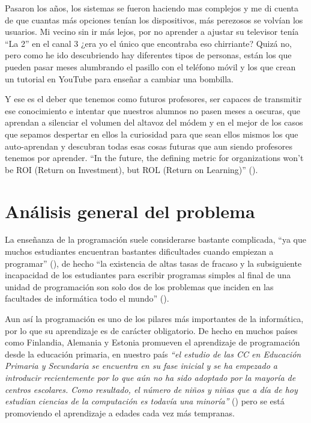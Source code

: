 \bigskip
Pasaron los años, los sistemas se fueron haciendo mas complejos y me di cuenta de que cuantas más opciones tenían los dispositivos, más perezosos se volvían los usuarios. Mi vecino sin ir más lejos, por no aprender a ajustar su televisor tenía ``La 2'' en el canal 3 ¿era yo el único que encontraba eso chirriante? Quizá no, pero como he ido descubriendo hay diferentes tipos de personas, están los que pueden pasar meses alumbrando el pasillo con el teléfono móvil y los que crean un tutorial en YouTube para enseñar a cambiar una bombilla.

\bigskip
Y ese es el deber que tenemos como futuros profesores, ser capaces de transmitir ese conocimiento e intentar que nuestros alumnos no pasen meses a oscuras, que aprendan a silenciar el volumen del altavoz del módem y en el mejor de los casos que sepamos despertar en ellos la curiosidad para que sean ellos mismos los que auto-aprendan y descubran todas esas cosas futuras que aun siendo profesores tenemos por aprender. ``In the future, the defining metric for organizations won’t be ROI (Return on Investment), but ROL (Return on Learning)'' (\cite{ismail_exponential_2014}).

\section{Análisis general del problema}

La enseñanza de la programación suele considerarse bastante complicada, ``ya que muchos estudiantes encuentran bastantes dificultades cuando empiezan a programar'' (\cite{rubio_uso_2018}), de hecho ``la existencia de altas tasas de fracaso y la subsiguiente incapacidad de los estudiantes para escribir programas simples al final de una unidad de programación son solo dos de los problemas que inciden en las facultades de informática todo el mundo'' (\cite{bruce_contemporary_2002}).

\bigskip
Aun así la programación es uno de los pilares más importantes de la informática, por lo que su aprendizaje es de carácter obligatorio. De hecho en muchos países como Finlandia, Alemania y Estonia promueven el aprendizaje de programación desde la educación primaria, en nuestro país \textit{``el estudio de las CC en Educación Primaria y Secundaria se encuentra en su fase inicial y se ha empezado a introducir recientemente por lo que aún no ha sido adoptado por la mayoría de centros escolares. Como resultado, el número de niños y niñas que a día de hoy estudian ciencias de la computación es todavía una minoría''} (\cite{fecyt_educacion_2016}) pero se está promoviendo el aprendizaje a edades cada vez más tempranas.

